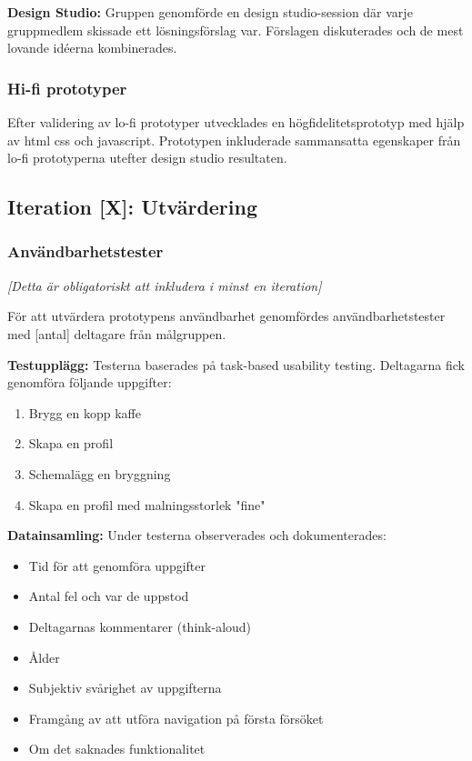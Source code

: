\textbf{Design Studio:} Gruppen genomförde en design studio-session där varje gruppmedlem skissade ett lösningsförslag var. Förslagen diskuterades och de mest lovande idéerna kombinerades. %



\subsubsection{Hi-fi prototyper}

Efter validering av lo-fi prototyper utvecklades en högfidelitetsprototyp med hjälp av html css och javascript. Prototypen inkluderade sammansatta egenskaper från lo-fi prototyperna utefter design studio resultaten.


\subsection{Iteration [X]: Utvärdering} %

\subsubsection{Användbarhetstester}

\textit{[Detta är obligatoriskt att inkludera i minst en iteration]}

För att utvärdera prototypens användbarhet genomfördes användbarhetstester med [antal] deltagare från målgruppen.

\textbf{Testupplägg:} Testerna baserades på task-based usability testing. Deltagarna fick genomföra följande uppgifter:
\begin{enumerate}
    \item Brygg en kopp kaffe
    \item Skapa en profil 
    \item Schemalägg en bryggning
    \item Skapa en profil med malningsstorlek "fine"
\end{enumerate}

\textbf{Datainsamling:} Under testerna observerades och dokumenterades:
\begin{itemize}
    \item Tid för att genomföra uppgifter
    \item Antal fel och var de uppstod
    \item Deltagarnas kommentarer (think-aloud)
    \item Ålder 
    \item Subjektiv svårighet av uppgifterna 
    \item Framgång av att utföra navigation på första försöket 
    \item Om det saknades funktionalitet
\end{itemize}

